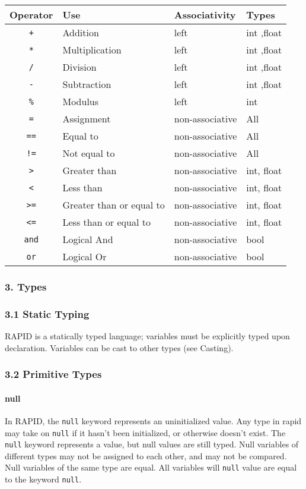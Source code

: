 \begin{longtable}[c]{@{}clll@{}}
\toprule
Operator & Use & Associativity & Types\tabularnewline
\midrule
\endhead
\texttt{+} & Addition & left & int ,float\tabularnewline
\texttt{*} & Multiplication & left & int ,float\tabularnewline
\texttt{/} & Division & left & int ,float\tabularnewline
\texttt{-} & Subtraction & left & int ,float\tabularnewline
\texttt{\%} & Modulus & left & int\tabularnewline
\texttt{=} & Assignment & non-associative & All\tabularnewline
\texttt{==} & Equal to & non-associative & All\tabularnewline
\texttt{!=} & Not equal to & non-associative & All\tabularnewline
\texttt{\textgreater{}} & Greater than & non-associative & int,
float\tabularnewline
\texttt{\textless{}} & Less than & non-associative & int,
float\tabularnewline
\texttt{\textgreater{}=} & Greater than or equal to & non-associative &
int, float\tabularnewline
\texttt{\textless{}=} & Less than or equal to & non-associative & int,
float\tabularnewline
\texttt{and} & Logical And & non-associative & bool\tabularnewline
\texttt{or} & Logical Or & non-associative & bool\tabularnewline
\bottomrule
\end{longtable}

\subsubsection{3. Types}\label{types}

\subsubsection{3.1 Static Typing}\label{static-typing}

RAPID is a statically typed language; variables must be explicitly typed
upon declaration. Variables can be cast to other types (see Casting).

\subsubsection{3.2 Primitive Types}\label{primitive-types}

\paragraph{null}\label{null}

In RAPID, the \texttt{null} keyword represents an uninitialized value.
Any type in rapid may take on \texttt{null} if it hasn't been
initialized, or otherwise doesn't exist. The \texttt{null} keyword
represents a value, but null values are still typed. Null variables of
different types may not be assigned to each other, and may not be
compared. Null variables of the same type are equal. All variables will
\texttt{null} value are equal to the keyword \texttt{null}.

